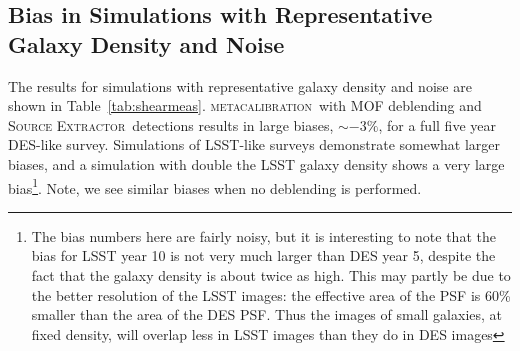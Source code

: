 \documentclass[fleqn,useAMS,usenatbib]{mnras}
\newcommand{\snr}{$S/N$}
\newcommand{\mcal}{\textsc{metacalibration}}
\newcommand{\sx}{\textsc{Source Extractor}}
\begin{document}
%
%

\subsection{Bias in Simulations with Representative Galaxy Density and Noise}

The results for simulations with representative galaxy density and noise are
shown in Table~\ref{tab:shearmeas}.  \mcal\ with MOF deblending and \sx\
detections results in large biases, $\sim-3\%$, for a full five year
DES-like survey. Simulations of LSST-like surveys demonstrate somewhat larger
biases, and a simulation with double the LSST galaxy density shows a very large
bias\footnote{The bias numbers here are fairly noisy, but it is interesting to
note that the bias for LSST year 10 is not very much larger than DES year 5,
despite the fact that the galaxy density is about twice as high.  This may
partly be due to the better resolution of the LSST images: the effective area
of the PSF is 60\% smaller than the area of the DES PSF.  Thus the images of
small galaxies, at fixed density, will overlap less in LSST images than they do
in DES images}.  Note, we see similar biases when no deblending is performed.
\end{document}
